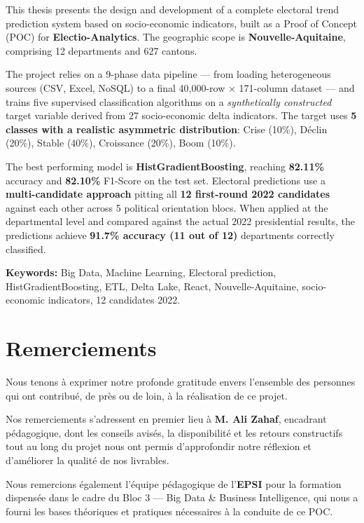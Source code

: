 \documentclass[12pt,a4paper,oneside]{report}
\begin{document}
This thesis presents the design and development of a complete electoral trend prediction system based on socio-economic indicators, built as a Proof of Concept (POC) for \textbf{Electio-Analytics}. The geographic scope is \textbf{Nouvelle-Aquitaine}, comprising 12 departments and 627 cantons.

The project relies on a 9-phase data pipeline — from loading heterogeneous sources (CSV, Excel, NoSQL) to a final 40,000-row × 171-column dataset — and trains five supervised classification algorithms on a \textit{synthetically constructed} target variable derived from 27 socio-economic delta indicators. The target uses \textbf{5 classes with a realistic asymmetric distribution}: Crise (10\%), Déclin (20\%), Stable (40\%), Croissance (20\%), Boom (10\%).

The best performing model is \textbf{HistGradientBoosting}, reaching \textbf{82.11\%} accuracy and \textbf{82.10\%} F1-Score on the test set. Electoral predictions use a \textbf{multi-candidate approach} pitting all \textbf{12 first-round 2022 candidates} against each other across 5 political orientation blocs. When applied at the departmental level and compared against the actual 2022 presidential results, the predictions achieve \textbf{91.7\% accuracy (11 out of 12)} departments correctly classified.

\bigskip
\noindent\textbf{Keywords:} Big Data, Machine Learning, Electoral prediction, HistGradientBoosting, ETL, Delta Lake, React, Nouvelle-Aquitaine, socio-economic indicators, 12 candidates 2022.

\chapter*{Remerciements}

Nous tenons à exprimer notre profonde gratitude envers l'ensemble des personnes qui ont contribué, de près ou de loin, à la réalisation de ce projet.

Nos remerciements s'adressent en premier lieu à \textbf{M. Ali Zahaf}, encadrant pédagogique, dont les conseils avisés, la disponibilité et les retours constructifs tout au long du projet nous ont permis d'approfondir notre réflexion et d'améliorer la qualité de nos livrables.

Nous remercions également l'équipe pédagogique de l'\textbf{EPSI} pour la formation dispensée dans le cadre du Bloc 3 — Big Data \& Business Intelligence, qui nous a fourni les bases théoriques et pratiques nécessaires à la conduite de ce POC.
\end{document}
